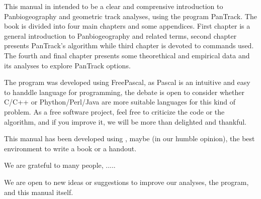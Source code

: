 This manual in intended to be a clear and comprensive 
introduction to Panbiogeography and geometric track analyses, using the program PanTrack. 
The book is divided into four main chapters and some appendices.
First chapter is a general introduction to Panbiogeography and related terms, second chapter presents
PanTrack's algorithm while third chapter is devoted to commands used. The fourth and final chapter presents
some theorethical and empirical  data and its analyses to explore PanTrack options.


\vspace{-7\baselineskip}
\vspace{7\baselineskip}


The program was developed using FreePascal, as Pascal is an intuitive and easy to handdle language for programming, 
the debate is open to consider whether C/C++ or Phython/Perl/Java are more suitable languages for this kind of problem. As a free
software project, feel free to criticize the code or the algorithm, and if you improve it, we will be more than delighted and thankful. 


\vspace{-7\baselineskip}
\vspace{7\baselineskip}

This manual has been developed using \TL, maybe (in our humble opinion), the best environment to write a book or a handout.



We are grateful to many people, .....

We are open to new ideas or suggestions to improve our analyses, the program, and this manual itself. 

\vspace{-7\baselineskip}
\vspace{7\baselineskip}
